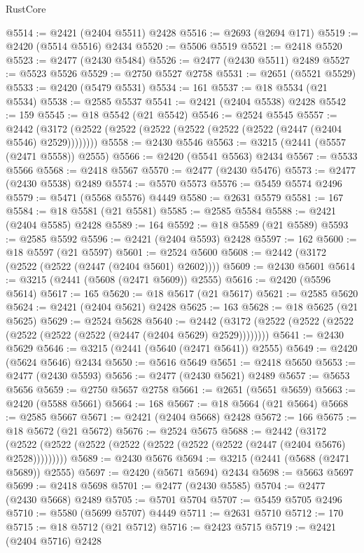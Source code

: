 \begin{lexlean}{RustCore}
\begin{coremodule}
@5514 := @2421 (@2404 @5511) @2428
@5516 := @2693 (@2694 @171)
@5519 := @2420 (@5514 @5516) @2434
@5520 := @5506 @5519
@5521 := @2418 @5520
@5523 := @2477 (@2430 @5484)
@5526 := @2477 (@2430 @5511) @2489
@5527 := @5523 @5526
@5529 := @2750 @5527 @2758
@5531 := @2651 (@5521 @5529)
@5533 := @2420 (@5479 @5531)
@5534 := 161
@5537 := @18 @5534 (@21 @5534)
@5538 := @2585 @5537
@5541 := @2421 (@2404 @5538) @2428
@5542 := 159
@5545 := @18 @5542 (@21 @5542)
@5546 := @2524 @5545
@5557 := @2442 (@3172 (@2522 (@2522 (@2522 (@2522 (@2522 (@2522 (@2447 (@2404 @5546) @2529))))))))
@5558 := @2430 @5546
@5563 := @3215 (@2441 (@5557 (@2471 @5558)) @2555)
@5566 := @2420 (@5541 @5563) @2434
@5567 := @5533 @5566
@5568 := @2418 @5567
@5570 := @2477 (@2430 @5476)
@5573 := @2477 (@2430 @5538) @2489
@5574 := @5570 @5573
@5576 := @5459 @5574 @2496
@5579 := @5471 (@5568 @5576) @4449
@5580 := @2631 @5579
@5581 := 167
@5584 := @18 @5581 (@21 @5581)
@5585 := @2585 @5584
@5588 := @2421 (@2404 @5585) @2428
@5589 := 164
@5592 := @18 @5589 (@21 @5589)
@5593 := @2585 @5592
@5596 := @2421 (@2404 @5593) @2428
@5597 := 162
@5600 := @18 @5597 (@21 @5597)
@5601 := @2524 @5600
@5608 := @2442 (@3172 (@2522 (@2522 (@2447 (@2404 @5601) @2602))))
@5609 := @2430 @5601
@5614 := @3215 (@2441 (@5608 (@2471 @5609)) @2555)
@5616 := @2420 (@5596 @5614)
@5617 := 165
@5620 := @18 @5617 (@21 @5617)
@5621 := @2585 @5620
@5624 := @2421 (@2404 @5621) @2428
@5625 := 163
@5628 := @18 @5625 (@21 @5625)
@5629 := @2524 @5628
@5640 := @2442 (@3172 (@2522 (@2522 (@2522 (@2522 (@2522 (@2522 (@2447 (@2404 @5629) @2529))))))))
@5641 := @2430 @5629
@5646 := @3215 (@2441 (@5640 (@2471 @5641)) @2555)
@5649 := @2420 (@5624 @5646) @2434
@5650 := @5616 @5649
@5651 := @2418 @5650
@5653 := @2477 (@2430 @5593)
@5656 := @2477 (@2430 @5621) @2489
@5657 := @5653 @5656
@5659 := @2750 @5657 @2758
@5661 := @2651 (@5651 @5659)
@5663 := @2420 (@5588 @5661)
@5664 := 168
@5667 := @18 @5664 (@21 @5664)
@5668 := @2585 @5667
@5671 := @2421 (@2404 @5668) @2428
@5672 := 166
@5675 := @18 @5672 (@21 @5672)
@5676 := @2524 @5675
@5688 := @2442
    (@3172 (@2522 (@2522 (@2522 (@2522 (@2522 (@2522 (@2522 (@2447 (@2404 @5676) @2528)))))))))
@5689 := @2430 @5676
@5694 := @3215 (@2441 (@5688 (@2471 @5689)) @2555)
@5697 := @2420 (@5671 @5694) @2434
@5698 := @5663 @5697
@5699 := @2418 @5698
@5701 := @2477 (@2430 @5585)
@5704 := @2477 (@2430 @5668) @2489
@5705 := @5701 @5704
@5707 := @5459 @5705 @2496
@5710 := @5580 (@5699 @5707) @4449
@5711 := @2631 @5710
@5712 := 170
@5715 := @18 @5712 (@21 @5712)
@5716 := @2423 @5715
@5719 := @2421 (@2404 @5716) @2428

\end{coremodule}
\end{lexlean}

